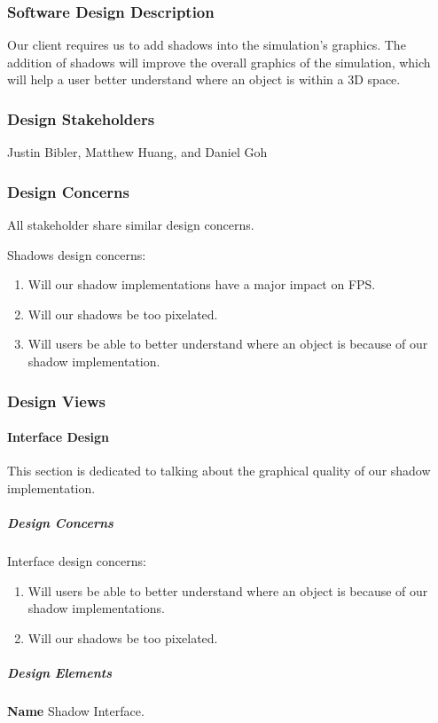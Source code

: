 \begin{flushleft}
\normalsize
\subsubsection{Software Design Description}
Our client requires us to add shadows into the simulation's graphics.
The addition of shadows will improve the overall graphics of the simulation, which will help a user better understand where an object is within a 3D space.

\subsubsection{Design Stakeholders}
Justin Bibler, Matthew Huang, and Daniel Goh

\subsubsection{Design Concerns}
All stakeholder share similar design concerns.

Shadows design concerns:
\begin{enumerate}
\item Will our shadow implementations have a major impact on FPS.
\item Will our shadows be too pixelated.
\item Will users be able to better understand where an object is because of our shadow implementation.
\end{enumerate}

\newpage

\subsubsection{Design Views}
\paragraph{Interface Design}
This section is dedicated to talking about the graphical quality of our shadow implementation.

\subparagraph{Design Concerns}
Interface design concerns:
\begin{enumerate}
\item Will users be able to better understand where an object is because of our shadow implementations.
\item Will our shadows be too pixelated.
\end{enumerate}

\subparagraph{Design Elements}
\textbf{Name}
Shadow Interface.


\end{flushleft}
